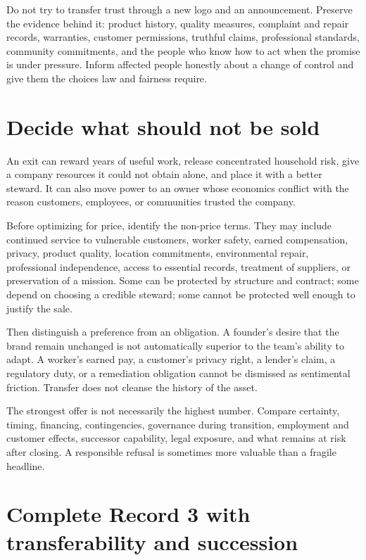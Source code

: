 Do not try to transfer trust through a new logo and an announcement. Preserve
the evidence behind it: product history, quality measures, complaint and repair
records, warranties, customer permissions, truthful claims, professional
standards, community commitments, and the people who know how to act when the
promise is under pressure. Inform affected people honestly about a change of
control and give them the choices law and fairness require.

\section{Decide what should not be sold}

An exit can reward years of useful work, release concentrated household risk,
give a company resources it could not obtain alone, and place it with a better
steward. It can also move power to an owner whose economics conflict with the
reason customers, employees, or communities trusted the company.

Before optimizing for price, identify the non-price terms. They may include
continued service to vulnerable customers, worker safety, earned compensation,
privacy, product quality, location commitments, environmental repair,
professional independence, access to essential records, treatment of suppliers,
or preservation of a mission. Some can be protected by structure and contract;
some depend on choosing a credible steward; some cannot be protected well enough
to justify the sale.

Then distinguish a preference from an obligation. A founder's desire that the
brand remain unchanged is not automatically superior to the team's ability to
adapt. A worker's earned pay, a customer's privacy right, a lender's claim, a
regulatory duty, or a remediation obligation cannot be dismissed as sentimental
friction. Transfer does not cleanse the history of the asset.

The strongest offer is not necessarily the highest number. Compare certainty,
timing, financing, contingencies, governance during transition, employment and
customer effects, successor capability, legal exposure, and what remains at
risk after closing. A responsible refusal is sometimes more valuable than a
fragile headline.

\section{Complete Record 3 with transferability and succession}

